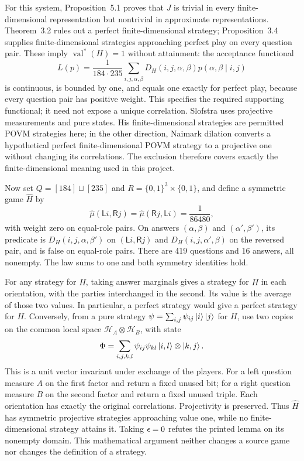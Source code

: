 \documentclass[11pt]{article}
\newcommand{\val}{\operatorname{val}}
\begin{document}
For this system, Proposition~5.1 proves that $J$ is trivial in every
finite-dimensional representation but nontrivial in approximate
representations. Theorem~3.2 rules out a perfect finite-dimensional strategy;
Proposition~3.4 supplies finite-dimensional strategies approaching perfect
play on every question pair. These imply $\val^*(H)=1$ without attainment:
the acceptance functional
\[
 L(p)=\frac{1}{184\cdot235}\sum_{i,j,\alpha,\beta}
       D_H(i,j,\alpha,\beta)p(\alpha,\beta\mid i,j)
\]
is continuous, is bounded by one, and equals one exactly for perfect play,
because every question pair has positive weight. This specifies the required
supporting functional; it need not expose a unique correlation. Slofstra
uses projective measurements and pure states. His finite-dimensional
strategies are permitted POVM strategies here; in the other direction,
Naimark dilation converts a hypothetical perfect finite-dimensional POVM
strategy to a projective one without changing its correlations. The exclusion
therefore covers exactly the finite-dimensional meaning used in this project.

Now set $Q=[184]\sqcup[235]$ and $R=\{0,1\}^3\times\{0,1\}$, and define
a symmetric game $\widehat H$ by
\[
 \widehat\mu(\mathsf L i,\mathsf R j)
 =\widehat\mu(\mathsf R j,\mathsf L i)=\frac{1}{86480},
\]
with weight zero on equal-role pairs. On answers $(\alpha,\beta)$ and
$(\alpha',\beta')$, its predicate is $D_H(i,j,\alpha,\beta')$ on
$(\mathsf L i,\mathsf R j)$ and $D_H(i,j,\alpha',\beta)$ on the reversed
pair, and is false on equal-role pairs. There are 419 questions and 16
answers, all nonempty. The law sums to one and both symmetry identities hold.

For any strategy for $\widehat H$, taking answer marginals gives a strategy
for $H$ in each orientation, with the parties interchanged in the second.
Its value is the average of those two values. In particular, a perfect
strategy would give a perfect strategy for $H$. Conversely, from a pure
strategy $\psi=\sum_{i,j}\psi_{ij}\ket i\ket j$ for $H$, use two copies
on the common local space $\mathcal H_A\otimes\mathcal H_B$, with state
\[
 \Phi=\sum_{i,j,k,l}\psi_{ij}\psi_{kl}
                 \ket{i,l}\otimes\ket{k,j}.
\]
This is a unit vector invariant under exchange of the players. For a left
question measure $A$ on the first factor and return a fixed unused bit;
for a right question measure $B$ on the second factor and return a fixed
unused triple. Each orientation has exactly the original correlations.
Projectivity is preserved. Thus $\widehat H$ has symmetric projective
strategies approaching value one, while no finite-dimensional strategy
attains it. Taking $\epsilon=0$ refutes the printed lemma on its nonempty domain.
This mathematical argument neither changes a source game nor changes the
definition of a strategy.
\end{document}
